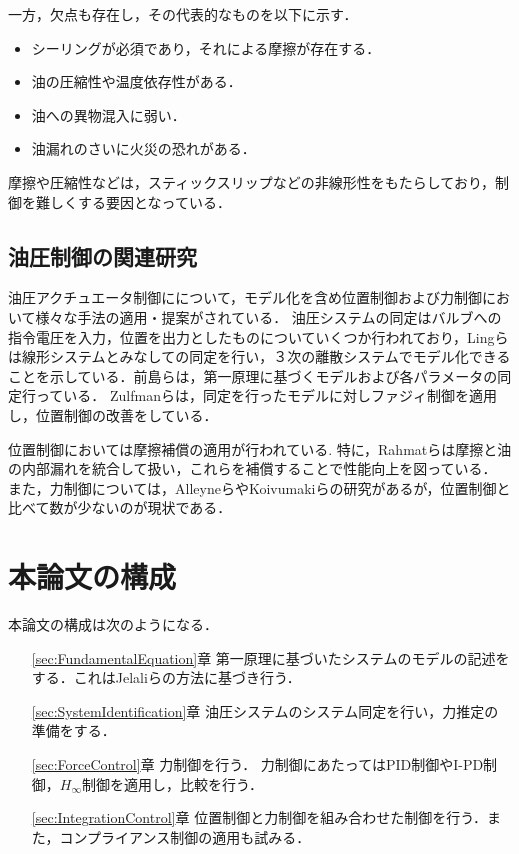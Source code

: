 一方，欠点も存在し，その代表的なものを以下に示す．
\begin{itemize}
    \item シーリングが必須であり，それによる摩擦が存在する．
    \item 油の圧縮性や温度依存性がある．
    \item 油への異物混入に弱い．
    \item 油漏れのさいに火災の恐れがある．
\end{itemize}
摩擦や圧縮性などは，スティックスリップなどの非線形性をもたらしており，制御を難しくする要因となっている\cite{松崎淳1962直動形油圧駆動機構におけるスティックスリップ,de1995new}．


\subsection{油圧制御の関連研究}
油圧アクチュエータ制御にについて，モデル化を含め位置制御および力制御において様々な手法の適用・提案がされている．
油圧システムの同定はバルブへの指令電圧を入力，位置を出力としたものについていくつか行われており，Lingらは線形システムとみなしての同定を行い，３次の離散システムでモデル化できることを示している\cite{ling2012system}．前島らは，第一原理に基づくモデルおよび各パラメータの同定\cite{前島祐三2011,前島祐三2014}行っている．
Zulfmanらは，同定を行ったモデルに対しファジィ制御を適用し，位置制御の改善をしている\cite{zheng2009application}．

位置制御においては摩擦補償の適用が行われている\cite{jianyong2012robust,rahmat2011modeling,lischinsky1999friction}.
特に，Rahmatらは摩擦と油の内部漏れを統合して扱い，これらを補償することで性能向上を図っている\cite{rahmat2011modeling}．
また，力制御については，AlleyneらやKoivumakiらの研究があるが，位置制御と比べて数が少ないのが現状である\cite{Alleyne,koivumaki2015stability}．



\section{本論文の構成}
本論文の構成は次のようになる．
\begin{itemize}
    \item [\ref{sec:FundamentalEquation}章]第一原理に基づいたシステムのモデルの記述をする．これはJelaliらの方法\cite{jelali2012hydraulic}に基づき行う．
    \item [\ref{sec:SystemIdentification}章]油圧システムのシステム同定を行い，力推定の準備をする．
    \item [\ref{sec:ForceControl}章]力制御を行う．
    力制御にあたってはPID制御やI-PD制御，$H_\infty$制御を適用し，比較を行う．
    \item [\ref{sec:IntegrationControl}章] 位置制御と力制御を組み合わせた制御を行う．また，コンプライアンス制御の適用も試みる．
\end{itemize}
